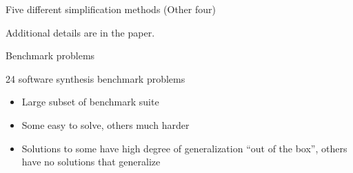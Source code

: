\documentclass{beamer}
\begin{document}
\begin{frame}{Five different simplification methods (Other four)}
~

Additional details are in the paper.

\end{frame}

\begin{frame}{Benchmark problems}

24 software synthesis benchmark problems
\begin{itemize}
	\item Large subset of benchmark suite~\cite{Helmuth:2015:GECCO}
	\item Some easy to solve, others much harder
	\item Solutions to some have high degree of generalization ``out of the box'', others have no solutions that generalize
\end{itemize}


\end{frame}
\end{document}
